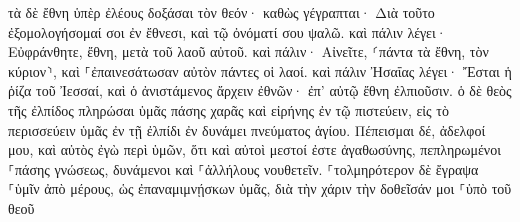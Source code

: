 \documentclass{openreader}
\begin{document}
τὰ δὲ ἔθνη ὑπὲρ ἐλέους δοξάσαι τὸν θεόν· καθὼς γέγραπται· Διὰ τοῦτο ἐξομολογήσομαί σοι ἐν ἔθνεσι, καὶ τῷ ὀνόματί σου ψαλῶ. 
καὶ πάλιν λέγει· Εὐφράνθητε, ἔθνη, μετὰ τοῦ λαοῦ αὐτοῦ. 
καὶ πάλιν· Αἰνεῖτε, ⸂πάντα τὰ ἔθνη, τὸν κύριον⸃, καὶ ⸀ἐπαινεσάτωσαν αὐτὸν πάντες οἱ λαοί. 
καὶ πάλιν Ἠσαΐας λέγει· Ἔσται ἡ ῥίζα τοῦ Ἰεσσαί, καὶ ὁ ἀνιστάμενος ἄρχειν ἐθνῶν· ἐπ’ αὐτῷ ἔθνη ἐλπιοῦσιν. 
ὁ δὲ θεὸς τῆς ἐλπίδος πληρώσαι ὑμᾶς πάσης χαρᾶς καὶ εἰρήνης ἐν τῷ πιστεύειν, εἰς τὸ περισσεύειν ὑμᾶς ἐν τῇ ἐλπίδι ἐν δυνάμει πνεύματος ἁγίου. 
Πέπεισμαι δέ, ἀδελφοί μου, καὶ αὐτὸς ἐγὼ περὶ ὑμῶν, ὅτι καὶ αὐτοὶ μεστοί ἐστε ἀγαθωσύνης, πεπληρωμένοι ⸀πάσης γνώσεως, δυνάμενοι καὶ ⸀ἀλλήλους νουθετεῖν. 
⸀τολμηρότερον δὲ ἔγραψα ⸀ὑμῖν ἀπὸ μέρους, ὡς ἐπαναμιμνῄσκων ὑμᾶς, διὰ τὴν χάριν τὴν δοθεῖσάν μοι ⸀ὑπὸ τοῦ θεοῦ 
\end{document}
